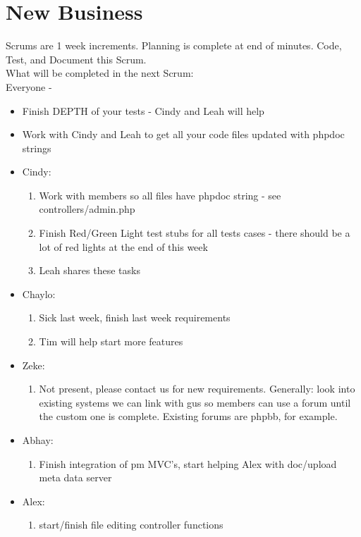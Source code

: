 \documentclass[12pt]{article}
\begin{document}
\section{New Business}
Scrums are 1 week increments. Planning is complete at end of minutes. Code, Test, and Document this Scrum.\\
What will be completed in the next Scrum:\\
Everyone - \\
\begin{itemize}
  \item Finish DEPTH of your tests - Cindy and Leah will help
  \item Work with Cindy and Leah to get all your code files updated with phpdoc strings
\end{itemize}
\begin{itemize}
\item Cindy:
\begin{enumerate}
 \item Work with members so all files have phpdoc string - see controllers/admin.php
 \item Finish Red/Green Light test stubs for all tests cases - there should be a lot of red lights at the end of this week
 \item Leah shares these tasks
\end{enumerate}
\item Chaylo:
\begin{enumerate}
 \item Sick last week, finish last week requirements
 \item Tim will help start more features
\end{enumerate}
\item Zeke:
\begin{enumerate}
 \item Not present, please contact us for new requirements. Generally: look into existing systems we can link with gus so members can use a forum until the custom one is complete. Existing forums are phpbb, for example.
\end{enumerate}
\item Abhay:
\begin{enumerate}
 \item Finish integration of pm MVC's, start helping Alex with doc/upload meta data server
\end{enumerate}
\item Alex:
\begin{enumerate}
 \item start/finish file editing controller functions

\end{enumerate}
\end{itemize}
\end{document}
